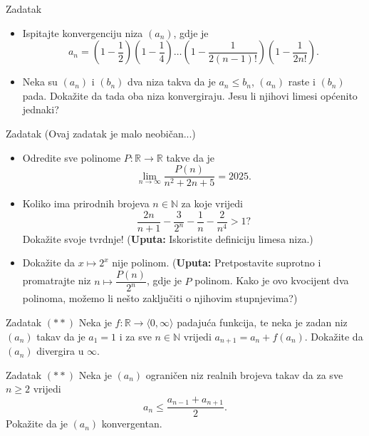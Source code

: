 \begin{exercise}{Zadatak} \textbf{}
\begin{itemize}
\item[a)] Ispitajte konvergenciju niza $(a_n)$, gdje je
$$a_n=\left(1-\dfrac{1}{2}\right)\left(1-\dfrac{1}{4}\right)\dots \left(1-\dfrac{1}{2(n-1)!}\right)\left(1-\dfrac{1}{2n!}\right).$$
\item[b)] Neka su \((a_n)\) i \((b_n)\) dva niza takva da je \(a_n\leq b_n\), \((a_n)\) raste i \((b_n)\) pada. Dokažite da tada oba niza konvergiraju. Jesu li njihovi limesi općenito jednaki?
\end{itemize}
\end{exercise}
\begin{exercise}{Zadatak} (Ovaj zadatak je malo neobičan...)
\begin{itemize}
\item[a)] Odredite sve polinome \(P : \mathbb{R}\to \mathbb{R}\) takve da je
\[\lim\limits_{n\to\infty}{\dfrac{P(n)}{n^2+2n+5}}=2025.\]
\item[b)] Koliko ima prirodnih brojeva \(n\in \mathbb{N}\) za koje vrijedi
\[\dfrac{2n}{n+1}-\dfrac{3}{2^n}-\dfrac{1}{n}-\dfrac{2}{n^4}>1?\]
Dokažite svoje tvrdnje! (\textbf{Uputa:} Iskoristite definiciju limesa niza.)
\item[c)] Dokažite da $x\mapsto 2^x$ nije polinom. (\textbf{Uputa:} Pretpostavite suprotno i promatrajte niz $n\mapsto \dfrac{P(n)}{2^n}$, gdje je $P$ polinom. Kako je ovo kvocijent dva polinoma, možemo li nešto zaključiti o njihovim stupnjevima?)
\end{itemize}
\end{exercise}
\begin{exercise}{Zadatak} \((**)\)
Neka je \(f : \mathbb{R}\to \langle 0, \infty\rangle\) padajuća funkcija, te neka je zadan niz \((a_n)\) takav da je \(a_1=1\) i za sve \(n\in \mathbb{N}\) vrijedi \(a_{n+1}=a_n+f(a_n)\). Dokažite da \((a_n)\) divergira u \(\infty\).
\end{exercise}
\begin{exercise}{Zadatak} \((**)\)
Neka je \((a_n)\) ograničen niz realnih brojeva takav da za sve \(n\geq 2\) vrijedi
\[a_n\leq \dfrac{a_{n-1}+a_{n+1}}{2}.\]
Pokažite da je \((a_n)\) konvergentan.
\end{exercise}
